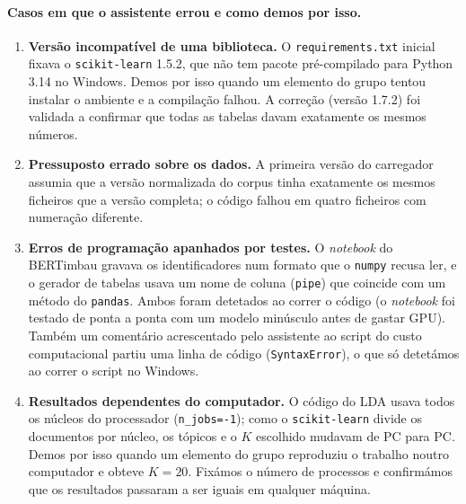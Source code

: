 \paragraph{Casos em que o assistente errou e como demos por isso.}
\begin{enumerate}
\item \textbf{Versão incompatível de uma biblioteca.} O \texttt{requirements.txt} inicial fixava o
\texttt{scikit-learn} 1.5.2, que não tem pacote pré-compilado para Python 3.14 no Windows. Demos
por isso quando um elemento do grupo tentou instalar o ambiente e a compilação falhou. A correção
(versão 1.7.2) foi validada a confirmar que todas as tabelas davam exatamente os mesmos números.
\item \textbf{Pressuposto errado sobre os dados.} A primeira versão do carregador assumia que a
versão normalizada do corpus tinha exatamente os mesmos ficheiros que a versão completa; o código
falhou em quatro ficheiros com numeração diferente.
\item \textbf{Erros de programação apanhados por testes.} O \emph{notebook} do BERTimbau gravava os
identificadores num formato que o \texttt{numpy} recusa ler, e o gerador de tabelas usava um nome
de coluna (\texttt{pipe}) que coincide com um método do \texttt{pandas}. Ambos foram detetados ao
correr o código (o \emph{notebook} foi testado de ponta a ponta com um modelo minúsculo antes de
gastar GPU). Também um comentário acrescentado pelo assistente ao script do custo computacional
partiu uma linha de código (\texttt{SyntaxError}), o que só detetámos ao correr o script no Windows.
\item \textbf{Resultados dependentes do computador.} O código do LDA usava todos os núcleos do
processador (\texttt{n\_jobs=-1}); como o \texttt{scikit-learn} divide os documentos por núcleo,
os tópicos e o $K$ escolhido mudavam de PC para PC. Demos por isso quando um elemento do grupo
reproduziu o trabalho noutro computador e obteve $K=20$. Fixámos o número de processos e
confirmámos que os resultados passaram a ser iguais em qualquer máquina.
\end{enumerate}
